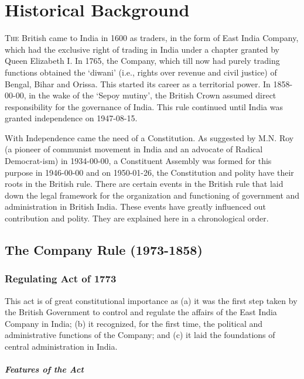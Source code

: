 \chapter{Historical Background}

\begin{multicols}{2}

\lettrine[lines=3,nindent=0pt]{T}{he} British came to India in 1600 as traders, in the form of East India Company, which had the exclusive right of trading in India under a chapter granted by Queen Elizabeth I. In 1765, the Company, which till now had purely trading functions obtained the `diwani' (i.e., rights over revenue and civil justice) of Bengal, Bihar and Orissa\endnote. This started its career as a territorial power. In 1858-00-00, in the wake of the `Sepoy mutiny', the British Crown assumed direct responsibility for the governance of India. This rule continued until India was granted independence on 1947-08-15.

With Independence came the need of a Constitution. As suggested by M.N. Roy (a pioneer of communist movement in India and an advocate of Radical Democrat-ism) in 1934-00-00, a Constituent Assembly was formed for this purpose in 1946-00-00 and on 1950-01-26, the Constitution and polity have their roots in the British rule. There are certain events in the British rule that laid down the legal framework for the organization and functioning of government and administration in British India. These events have greatly influenced out contribution and polity. They are explained here in a chronological order.

\section{The Company Rule (1973-1858)}
\subsection{Regulating Act of 1773}
This act is of great constitutional importance as (a) it was the first step taken by the British Government to control and regulate the affairs of the East India Company in India; (b) it recognized, for the first time, the political and administrative functions of the Company; and (c) it laid the foundations of central administration in India.

\paragraph{Features of the Act}


\end{multicols}
